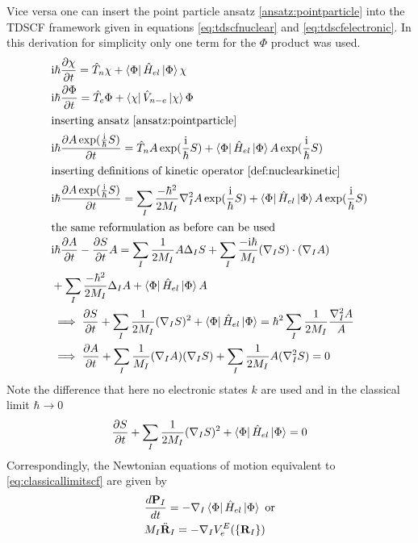 \documentclass[12pt]{scrartcl}
\begin{document}
Vice versa one can insert the point particle ansatz \ref{ansatz:pointparticle} into the TDSCF framework given in equations \ref{eq:tdscfnuclear} and \ref{eq:tdscfelectronic}. In this derivation for simplicity only one term for the $\Phi$ product was used.
\begin{align}
&\mathrm{i}\hbar \frac{\partial \chi}{\partial t} = \hat{T}_n\chi+  \Bra{\Phi} \hat{H}_{el}\Ket{\Phi} \chi\label{eq:tdesescfnuclei}\\
&\mathrm{i}\hbar \frac{\partial\Phi}{\partial t}= \hat{T}_e \Phi + \Bra{\chi} \hat{V}_{n-e} \Ket{\chi} \Phi\label{eq:tdesescfelectric}\\
\intertext{inserting ansatz \ref{ansatz:pointparticle}}
&\mathrm{i}\hbar \frac{\partial A\exp(\frac{\mathrm{i}}{\hbar}S)}{\partial t} = \hat{T}_nA\exp(\frac{\mathrm{i}}{\hbar}S)+  \Bra{\Phi} \hat{H}_{el}\Ket{\Phi} A\exp(\frac{\mathrm{i}}{\hbar}S)\nonumber\\
\intertext{inserting definitions of kinetic operator \ref{def:nuclearkinetic}}
&\mathrm{i}\hbar \frac{\partial A\exp(\frac{\mathrm{i}}{\hbar}S)}{\partial t} = \sum_I \frac{-\hbar^2}{2M_I}\nabla_I^2 A\exp(\frac{\mathrm{i}}{\hbar}S)+  \Bra{\Phi} \hat{H}_{el}\Ket{\Phi} A\exp(\frac{\mathrm{i}}{\hbar}S)\nonumber\\
\intertext{the same reformulation as before can be used}
&\mathrm{i}\hbar\frac{\partial A}{\partial t}-\frac{\partial S}{\partial t}A=\sum_I\frac{1}{2M_I}A\Delta_IS+\sum_I\frac{-\mathrm{i}\hbar}{M_I}(\nabla_IS)\cdot(\nabla_IA)\nonumber\\
&+\sum_I\frac{-\hbar^2}{2M_I}\Delta_IA+\Bra{\Phi} \hat{H}_{el}\Ket{\Phi} A\nonumber\\
&\implies\frac{\partial S}{\partial t} + \sum_I\frac{1}{2M_I}(\nabla_IS)^2+\Bra{\Phi} \hat{H}_{el}\Ket{\Phi}=\hbar^2\sum_I\frac{1}{2M_I}\frac{\nabla_I^2A}{A}\nonumber\\
&\implies\frac{\partial A}{\partial t}+\sum_I\frac{1}{M_I}(\nabla_IA)(\nabla_IS)+\sum_I\frac{1}{2M_I}A(\nabla_I^2S)=0\nonumber
\end{align}
Note the difference that here no electronic states $k$ are used and in the classical limit $\hbar \to 0$
\begin{equation}
\frac{\partial S}{\partial t} + \sum_I\frac{1}{2M_I}(\nabla_IS)^2+\Bra{\Phi} \hat{H}_{el}\Ket{\Phi}=0
\label{eq:classicallimitscf}
\end{equation}
Correspondingly, the Newtonian equations of motion equivalent to \ref{eq:classicallimitscf} are given by
\begin{align}
&\frac{d \mathbf{P}_I}{dt} = -\nabla_I\Bra{\Phi} \hat{H}_{el}\Ket{\Phi}\text{ or}\nonumber\\
&M_I\ddot{\mathbf{R}}_I = -\nabla_IV_e^{E}(\{ \mathbf{R}_I\})\label{eq:eomscf}
\end{align}
\end{document}
